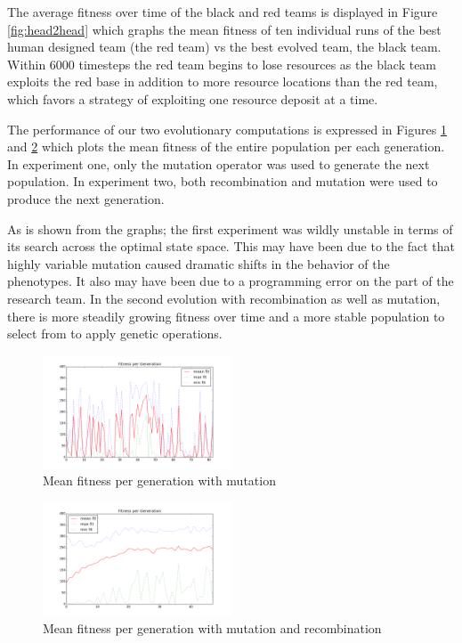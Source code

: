 \documentclass[12pt,journal,compsoc]{IEEEtran}
\begin{document}
The average fitness over time of the black and red teams is displayed in Figure \ref{fig:head2head} which graphs the mean fitness of ten individual runs of the best human designed team (the red team) vs the best evolved team, the black team. Within 6000 timesteps the red team begins to lose resources as the black team exploits the red base in addition to more resource locations than the red team, which favors a strategy of exploiting one resource deposit at a time.

The performance of our two evolutionary computations is expressed in Figures \ref{fig:meanfit1} and \ref{fig:meanfit2} which plots the mean fitness of the entire population per each generation. In experiment one, only the mutation operator was used to generate the next population. In experiment two, both recombination and mutation were used to produce the next generation.

As is shown from the graphs; the first experiment was wildly unstable in terms of its search across the optimal state space. This may have been due to the fact that highly variable mutation caused dramatic shifts in the behavior of the phenotypes. It also may have been due to a programming error on the part of the research team. In the second evolution with recombination as well as mutation, there is more steadily growing fitness over time and a more stable population to select from to apply genetic operations.

\begin{figure}[ht!]
    \centering
        \includegraphics[width=0.5\textwidth]{figures/meanfit_experiment1}
    \caption{Mean fitness per generation with mutation}
    \label{fig:meanfit1}
\end{figure}

\begin{figure}[ht!]
    \centering
        \includegraphics[width=0.5\textwidth]{figures/fitness46}
    \caption{Mean fitness per generation with mutation and recombination}
    \label{fig:meanfit2}
\end{figure}
\end{document}
